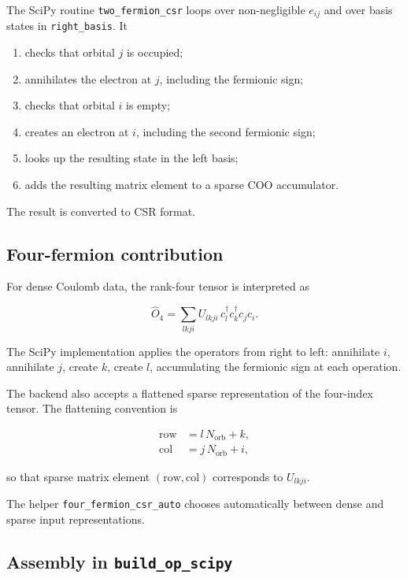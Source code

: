 \documentclass[11pt]{article}
\begin{document}
The SciPy routine \texttt{two\_fermion\_csr} loops over non-negligible \(e_{ij}\) and over basis states in \texttt{right\_basis}.  It

\begin{enumerate}[label=\arabic*.]
  \item checks that orbital \(j\) is occupied;
  \item annihilates the electron at \(j\), including the fermionic sign;
  \item checks that orbital \(i\) is empty;
  \item creates an electron at \(i\), including the second fermionic sign;
  \item looks up the resulting state in the left basis;
  \item adds the resulting matrix element to a sparse COO accumulator.
\end{enumerate}

The result is converted to CSR format.

\subsection{Four-fermion contribution}

For dense Coulomb data, the rank-four tensor is interpreted as

\begin{equation}
  \hat O_4 = \sum_{lkji}
  U_{lkji}\,
  c_l^\dagger c_k^\dagger c_j c_i.
\end{equation}

The SciPy implementation applies the operators from right to left: annihilate \(i\), annihilate \(j\), create \(k\), create \(l\), accumulating the fermionic sign at each operation.

The backend also accepts a flattened sparse representation of the four-index tensor.  The flattening convention is

\begin{align}
  \mathrm{row} &= l\,N_{\mathrm{orb}} + k,\\
  \mathrm{col} &= j\,N_{\mathrm{orb}} + i,
\end{align}

so that sparse matrix element \((\mathrm{row},\mathrm{col})\) corresponds to \(U_{lkji}\).

The helper \texttt{four\_fermion\_csr\_auto} chooses automatically between dense and sparse input representations.

\subsection{Assembly in \texttt{build\_op\_scipy}}
\end{document}
